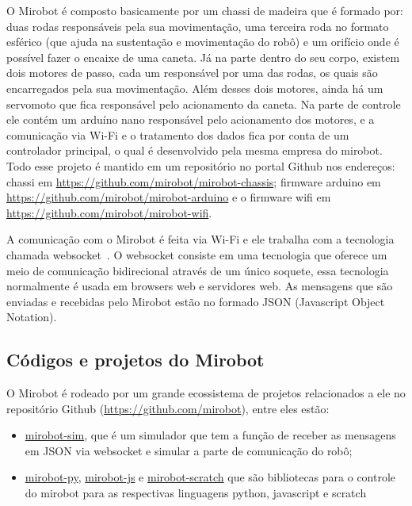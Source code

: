 O Mirobot é composto basicamente por um chassi de madeira que é formado por:
duas rodas responsáveis pela sua movimentação, uma terceira roda no formato
esférico (que ajuda na sustentação e movimentação do robô) e um orifício onde é
possível fazer o encaixe de uma caneta.
Já na parte dentro do seu corpo,
existem dois motores de passo, cada um responsável por uma das rodas, os quais
são encarregados pela sua movimentação. 
Além desses dois motores, ainda há um
servomoto que fica responsável pelo acionamento da caneta. 
Na parte de controle
ele contém um arduíno nano responsável pelo acionamento dos motores, e a
comunicação via Wi-Fi e o tratamento dos dados fica por conta de um controlador
principal, o qual é desenvolvido pela mesma empresa do mirobot.
Todo esse projeto é mantido em um repositório no portal Github nos endereços: chassi em \href{https://github.com/mirobot/mirobot-chassis}{https://github.com/mirobot/mirobot-chassis}; firmware arduino em \href{https://github.com/mirobot/mirobot-arduino}{https://github.com/mirobot/mirobot-arduino} e o firmware wifi em \href{https://github.com/mirobot/mirobot-wifi}{https://github.com/mirobot/mirobot-wifi}.


A comunicação com o Mirobot é feita via Wi-Fi e ele trabalha com a tecnologia
chamada websocket~\cite{websocket2011}. O websocket consiste em uma tecnologia que oferece um meio
de comunicação bidirecional através de um único soquete, essa tecnologia
normalmente é usada em browsers web e servidores web. 
As mensagens que são
enviadas e recebidas pelo Mirobot estão no formado JSON (Javascript Object
Notation).

\subsection{Códigos e projetos do Mirobot}
\label{subsec:mirobotcodigos}


O Mirobot é rodeado por um grande ecossistema de projetos relacionados a ele no
repositório Github (\url{https://github.com/mirobot}), entre eles estão:

\begin{itemize}
    \item \href{https://github.com/mirobot/mirobot-sim}{mirobot-sim}, que é um simulador
que tem a função de receber as mensagens em JSON via websocket e simular a
parte de comunicação do robô;
    \item \href{https://github.com/mirobot/mirobot-py}{mirobot-py},
\href{https://github.com/mirobot/mirobot-js}{mirobot-js} e
\href{https://github.com/mirobot/mirobot-scratch}{mirobot-scratch} que são
bibliotecas para o controle do mirobot para as respectivas linguagens python,
javascript e scratch
\end{itemize}

